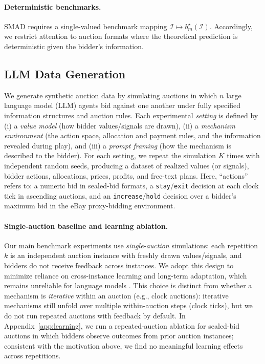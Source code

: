 \documentclass[acmsmall,screen,review]{acmart}
\begin{document}
\paragraph{Deterministic benchmarks.}
SMAD requires a single-valued benchmark mapping $\mathcal I \mapsto b_m^\star(\mathcal I)$.
Accordingly, we restrict attention to auction formats where the theoretical prediction is deterministic given the bidder’s information.

\subsection{LLM Data Generation}
\label{sec:data_generation}

We generate synthetic auction data by simulating auctions in which $n$ large language model (LLM) agents bid against one another under fully specified information structures and auction rules. Each experimental \emph{setting} is defined by (i) a \emph{value model} (how bidder values/signals are drawn), (ii) a \emph{mechanism environment} (the action space, allocation and payment rules, and the information revealed during play), and (iii) a \emph{prompt framing} (how the mechanism is described to the bidder). For each setting, we repeat the simulation $K$ times with independent random seeds, producing a dataset of realized values (or signals), bidder actions, allocations, prices, profits, and free-text plans. Here, ``actions'' refers to: a numeric bid in sealed-bid formats, a \texttt{stay}/\texttt{exit} decision at each clock tick in ascending auctions, and an \texttt{increase}/\texttt{hold} decision over a bidder's maximum bid in the eBay proxy-bidding environment.

\paragraph{Single-auction baseline and learning ablation.}
Our main benchmark experiments use \emph{single-auction} simulations: each repetition $k$ is an independent auction instance with freshly drawn values/signals, and bidders do not receive feedback across instances. We adopt this design to minimize reliance on cross-instance learning and long-term adaptation, which remains unreliable for language models \citep{dong2024survey}. This choice is distinct from whether a mechanism is \emph{iterative} within an auction (e.g., clock auctions): iterative mechanisms still unfold over multiple within-auction steps (clock ticks), but we do not run repeated auctions with feedback by default. In Appendix~\ref{app:learning}, we run a repeated-auction ablation for sealed-bid auctions in which bidders observe outcomes from prior auction instances; consistent with the motivation above, we find no meaningful learning effects across repetitions.
\end{document}
